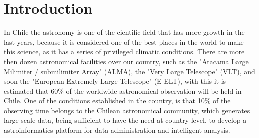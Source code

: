 %

\section{Introduction}

In Chile the astronomy is one of the cientific field that has more growth in
the last years, because it is considered one of the best places in the world to
make this science, as it has a series of privileged climatic conditions.  There
are more then dozen astronomical facilities over our country, such as the
"Atacama Large Milimiter / submilimiter Array" (ALMA), the "Very Large
Telescope" (VLT), and soon the "European Extremely Large Telescope" (E-ELT),
with this it is estimated that 60\% of the worldwide astronomical observation
will be held in Chile. One of the conditions established in the country, is
that 10\% of the observing time belongs to the Chilean astronomical community,
which generates large-scale data, being sufficient to have the need at country
level, to develop a astroinformatics platform for data administration and
intelligent analysis.
